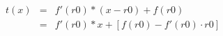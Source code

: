 \documentclass[11pt]{article}
\begin{document}
\[
\begin{array}{lcl}
t(x) & = & f'(r0) * (x - r0) + f(r0)\\
     & = & f'(r0) * x + [f(r0) - f'(r0) \cdot r0] \\
\end{array}
\]
\end{document}
